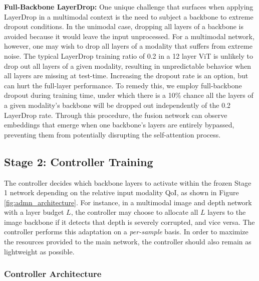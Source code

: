 \textbf{Full-Backbone LayerDrop:} 
One unique challenge that surfaces when applying LayerDrop in a multimodal context is the need to subject a backbone to extreme dropout conditions. In the unimodal case, dropping all layers of a backbone is avoided because it would leave the input unprocessed. For a multimodal network, however, one may wish to drop all layers of a modality that suffers from extreme noise. The typical LayerDrop training ratio of 0.2 in a 12 layer ViT is unlikely to drop out all layers of a given modality, resulting in unpredictable behavior when all layers are missing at test-time. Increasing the dropout rate is an option, but can hurt the full-layer performance. To remedy this, we employ full-backbone dropout during training time, under which there is a 10\% chance all the layers of a given modality's backbone will be dropped out independently of the 0.2 LayerDrop rate. Through this procedure, the fusion network can observe embeddings that emerge when one backbone's layers are entirely bypassed, preventing them from potentially disrupting the self-attention process. 



\subsection{Stage 2: Controller Training}

The controller decides which backbone layers to activate within the frozen Stage 1 network depending on the relative input modality QoI, as shown in Figure \ref{fig:admn_architecture}. For instance, in a multimodal image and depth network with a layer budget $L$, the controller may choose to allocate all $L$ layers to the image backbone if it detects that depth is severely corrupted, and vice versa. The controller performs this adaptation on a \emph{per-sample} basis. In order to maximize the resources provided to the main network, the controller should also remain as lightweight as possible. 





\subsubsection{Controller Architecture}

